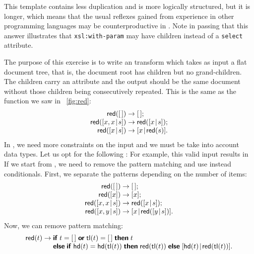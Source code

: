This template contains less duplication and is more logically
structured, but it is longer, which means that the usual reflexes
gained from experience in other programming languages may be
counterproductive in \XSLT. Note in passing that this answer
illustrates that \texttt{xsl:with-param} may have children instead of
a \texttt{select} attribute.


The purpose of this exercise is to write an \XSLT transform which
takes as input a flat document tree, that is, the document root has
children but no grand\hyp{}children. The children carry an attribute
and the output should be the same document without those children
being consecutively repeated. This is the same as the function
 we saw in \fig~\vref{fig:red}:
\begin{equation*}
\begin{array}{@{}r@{\;}c@{\;}l@{}}
\fun{red}(\el) & \rightarrow & \el;\\
\fun{red}(\cons{x,x}{s}) & \rightarrow & \fun{red}(\cons{x}{s});\\
\fun{red}(\cons{x}{s})   & \rightarrow & \cons{x}{\fun{red}(s)}.
\end{array}
\end{equation*}
In \XSLT, we need more constraints on the input and we must be take
into account data types. Let us opt for the following \DTD:
\noindent For example, this valid input
\noindent results in
\noindent If we start from , we need to remove the pattern
matching and use instead conditionals. First, we separate the patterns
depending on the number of items:
\begin{equation*}
\begin{array}{@{}r@{\;}c@{\;}l@{}}
\fun{red}(\el) & \rightarrow & \el;\\
\fun{red}([x]) & \rightarrow & [x];\\
\fun{red}(\cons{x,x}{s}) & \rightarrow & \fun{red}(\cons{x}{s});\\
\fun{red}(\cons{x,y}{s}) & \rightarrow & \cons{x}{\fun{red}(\cons{y}{s})}.
\end{array}
\end{equation*}
Now, we can remove pattern matching:
\begin{equation*}
\begin{array}{@{}r@{\;}c@{\;}l@{}}
\fun{red}(t) & \rightarrow & \xkwd{if} \; t=\el\; \xkwd{or} \;
                             \fun{tl}(t)=\el \; \xkwd{then} \; t\\
             &             & \xkwd{else} \; \xkwd{if} \; \fun{hd}(t) = \fun{hd}(\fun{tl}(t)) \;
\xkwd{then} \; \fun{red}(\fun{tl}(t)) \; \xkwd{else} \; \cons{\fun{hd}(t)}{\fun{red}(\fun{tl}(t))}.
\end{array}
\end{equation*}
